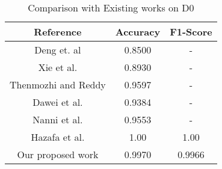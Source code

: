 \begin{table}[!htbp]
\centering
\begin{tabular}{|c|c|c|}
\hline
\textbf{Reference} & \textbf{Accuracy} & \textbf{F1-Score}\\
\hline
Deng et. al \cite{deng2018uav} & 0.8500 & -\\
Xie et al.\cite{xie2015automatic} & 0.8930 & -\\
Thenmozhi and Reddy\cite{thenmozhi2019crop} & 0.9597 & -\\
Dawei et al.\cite{dawei2019recognition} & 0.9384 & -\\
Nanni et al.\cite{nanni2022high} & 0.9553 & -\\
Hazafa et al.\cite{hazafa2022evaluation} & 1.00 & 1.00\\
Our proposed work & 0.9970 & 0.9966\\
\hline
\end{tabular}
\caption{Comparison with Existing works on D0}
\end{table}